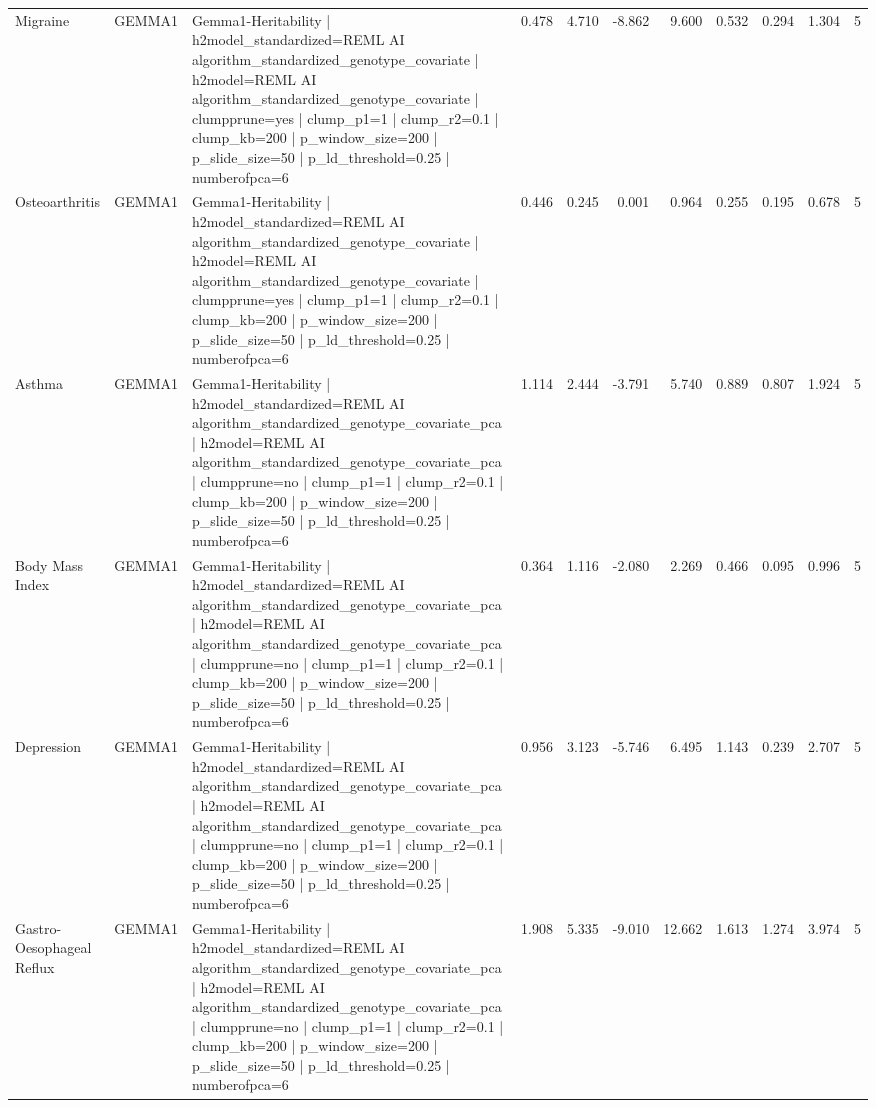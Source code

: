 \begin{landscape}
\begin{longtable}{p{2.4cm}p{1.8cm}p{6.0cm}rrrrrrrr}
Migraine & GEMMA1 & Gemma1-Heritability | h2model\_standardized=REML AI algorithm\_standardized\_genotype\_covariate | h2model=REML AI algorithm\_standardized\_genotype\_covariate | clumpprune=yes | clump\_p1=1 | clump\_r2=0.1 | clump\_kb=200 | p\_window\_size=200 | p\_slide\_size=50 | p\_ld\_threshold=0.25 | numberofpca=6 & 0.478 & 4.710 & -8.862 & 9.600 & 0.532 & 0.294 & 1.304 & 5 \\
Osteoarthritis & GEMMA1 & Gemma1-Heritability | h2model\_standardized=REML AI algorithm\_standardized\_genotype\_covariate | h2model=REML AI algorithm\_standardized\_genotype\_covariate | clumpprune=yes | clump\_p1=1 | clump\_r2=0.1 | clump\_kb=200 | p\_window\_size=200 | p\_slide\_size=50 | p\_ld\_threshold=0.25 | numberofpca=6 & 0.446 & 0.245 & 0.001 & 0.964 & 0.255 & 0.195 & 0.678 & 5 \\
Asthma & GEMMA1 & Gemma1-Heritability | h2model\_standardized=REML AI algorithm\_standardized\_genotype\_covariate\_pca | h2model=REML AI algorithm\_standardized\_genotype\_covariate\_pca | clumpprune=no | clump\_p1=1 | clump\_r2=0.1 | clump\_kb=200 | p\_window\_size=200 | p\_slide\_size=50 | p\_ld\_threshold=0.25 | numberofpca=6 & 1.114 & 2.444 & -3.791 & 5.740 & 0.889 & 0.807 & 1.924 & 5 \\
Body Mass Index & GEMMA1 & Gemma1-Heritability | h2model\_standardized=REML AI algorithm\_standardized\_genotype\_covariate\_pca | h2model=REML AI algorithm\_standardized\_genotype\_covariate\_pca | clumpprune=no | clump\_p1=1 | clump\_r2=0.1 | clump\_kb=200 | p\_window\_size=200 | p\_slide\_size=50 | p\_ld\_threshold=0.25 | numberofpca=6 & 0.364 & 1.116 & -2.080 & 2.269 & 0.466 & 0.095 & 0.996 & 5 \\
Depression & GEMMA1 & Gemma1-Heritability | h2model\_standardized=REML AI algorithm\_standardized\_genotype\_covariate\_pca | h2model=REML AI algorithm\_standardized\_genotype\_covariate\_pca | clumpprune=no | clump\_p1=1 | clump\_r2=0.1 | clump\_kb=200 | p\_window\_size=200 | p\_slide\_size=50 | p\_ld\_threshold=0.25 | numberofpca=6 & 0.956 & 3.123 & -5.746 & 6.495 & 1.143 & 0.239 & 2.707 & 5 \\
Gastro-Oesophageal Reflux & GEMMA1 & Gemma1-Heritability | h2model\_standardized=REML AI algorithm\_standardized\_genotype\_covariate\_pca | h2model=REML AI algorithm\_standardized\_genotype\_covariate\_pca | clumpprune=no | clump\_p1=1 | clump\_r2=0.1 | clump\_kb=200 | p\_window\_size=200 | p\_slide\_size=50 | p\_ld\_threshold=0.25 | numberofpca=6 & 1.908 & 5.335 & -9.010 & 12.662 & 1.613 & 1.274 & 3.974 & 5 \\

\end{longtable}
\end{landscape}
